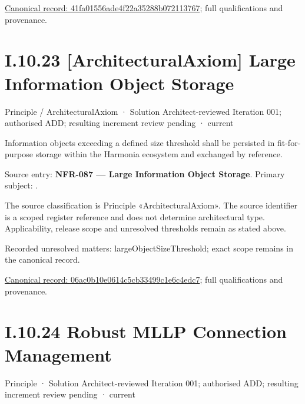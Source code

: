 {\footnotesize \href{../../../../../../../../continuum/motivation/principle/architectural-axiom/41fa01556ade4f22a35288b072113767.md}{Canonical record: 41fa01556ade4f22a35288b072113767}; full qualifications and provenance.}\par
\section*{I.10.23 [ArchitecturalAxiom] Large Information Object Storage}
\label{navigation:I.10.23}

\label{element:06ac0b10e0614c5cb33499c1e6c4edc7}
{\small Principle / ArchitecturalAxiom · Solution Architect-reviewed Iteration 001; authorised ADD; resulting increment review pending · current}\par

Information objects exceeding a defined size threshold shall be persisted in fit-for-purpose storage within the Harmonia ecosystem and exchanged by reference.



Source entry: \textbf{NFR-087 — Large Information Object Storage}. Primary subject: \texttt{}.



The source classification is Principle «ArchitecturalAxiom». The source identifier is a scoped register reference and does not determine architectural type. Applicability, release scope and unresolved thresholds remain as stated above.


{\small Recorded unresolved matters: largeObjectSizeThreshold; exact scope remains in the canonical record.}\par
{\footnotesize \href{../../../../../../../../continuum/motivation/principle/architectural-axiom/06ac0b10e0614c5cb33499c1e6c4edc7.md}{Canonical record: 06ac0b10e0614c5cb33499c1e6c4edc7}; full qualifications and provenance.}\par
\section*{I.10.24 Robust MLLP Connection Management}
\label{navigation:I.10.24}

\label{element:e7b7d94a94194ef28a12051a550d3f3f}
{\small Principle · Solution Architect-reviewed Iteration 001; authorised ADD; resulting increment review pending · current}\par

